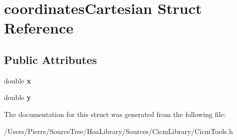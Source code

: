 \hypertarget{structcoordinates_cartesian}{\section{coordinates\-Cartesian Struct Reference}
\label{structcoordinates_cartesian}
}
\subsection*{Public Attributes}
\begin{DoxyCompactItemize}
\item 
\hypertarget{structcoordinates_cartesian_acfe9f9d0a096f0db54ad19336408a665}{double {\bfseries x}}\label{structcoordinates_cartesian_acfe9f9d0a096f0db54ad19336408a665}

\item 
\hypertarget{structcoordinates_cartesian_a80c25239b4ed71c31d8968c762d5432d}{double {\bfseries y}}\label{structcoordinates_cartesian_a80c25239b4ed71c31d8968c762d5432d}

\end{DoxyCompactItemize}


The documentation for this struct was generated from the following file\-:\begin{DoxyCompactItemize}
\item 
/\-Users/\-Pierre/\-Source\-Tree/\-Hoa\-Library/\-Sources/\-Cicm\-Library/Cicm\-Tools.\-h\end{DoxyCompactItemize}
